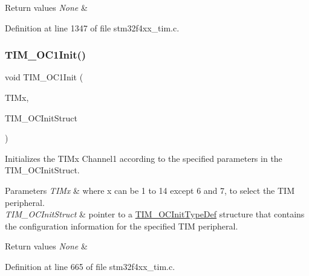\begin{DoxyRetVals}{Return values}
{\em None} & \\
\hline
\end{DoxyRetVals}


Definition at line 1347 of file stm32f4xx\+\_\+tim.\+c.

\mbox{\label{group___t_i_m___group2_gafcdb6ff00158862aef7fed5e7a554a3e}} 
\subsubsection{\texorpdfstring{T\+I\+M\+\_\+\+O\+C1\+Init()}{TIM\_OC1Init()}}
{\footnotesize\ttfamily void T\+I\+M\+\_\+\+O\+C1\+Init (\begin{DoxyParamCaption}\item[{\hyperlink{struct_t_i_m___type_def}{T\+I\+M\+\_\+\+Type\+Def} $\ast$}]{T\+I\+Mx,  }\item[{\hyperlink{struct_t_i_m___o_c_init_type_def}{T\+I\+M\+\_\+\+O\+C\+Init\+Type\+Def} $\ast$}]{T\+I\+M\+\_\+\+O\+C\+Init\+Struct }\end{DoxyParamCaption})}



Initializes the T\+I\+Mx Channel1 according to the specified parameters in the T\+I\+M\+\_\+\+O\+C\+Init\+Struct. 


\begin{DoxyParams}{Parameters}
{\em T\+I\+Mx} & where x can be 1 to 14 except 6 and 7, to select the T\+IM peripheral. \\
\hline
{\em T\+I\+M\+\_\+\+O\+C\+Init\+Struct} & pointer to a \hyperlink{struct_t_i_m___o_c_init_type_def}{T\+I\+M\+\_\+\+O\+C\+Init\+Type\+Def} structure that contains the configuration information for the specified T\+IM peripheral. \\
\hline
\end{DoxyParams}

\begin{DoxyRetVals}{Return values}
{\em None} & \\
\hline
\end{DoxyRetVals}


Definition at line 665 of file stm32f4xx\+\_\+tim.\+c.

